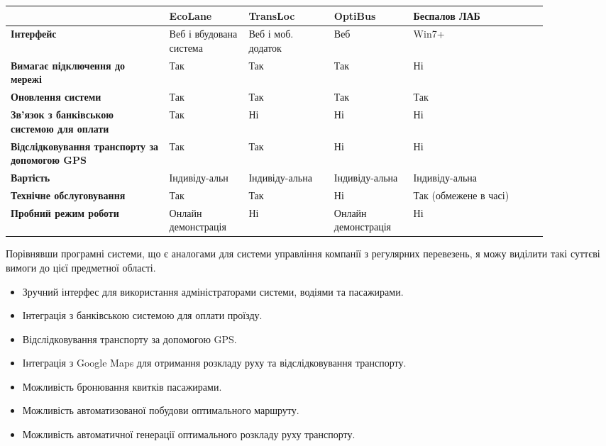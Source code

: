 \documentclass[14pt]{extreport}
\begin{document}
\begin{normalsize}
	\begin{table}[H]
		\centering
		\renewcommand*\arraystretch{1.3}
		\begin{tabular}{|p{0.26\linewidth}|p{0.13\linewidth}|p{0.14\linewidth}|p{0.13\linewidth}|p{0.22\linewidth}|}
			\hline
			 & \textbf{EcoLane} & \textbf{TransLoc} & \textbf{OptiBus} & \textbf{Беспалов ЛАБ}\\\hline
			\textbf{Інтерфейс} & Веб і вбудована система & Веб і моб. додаток & Веб & Win7+ \\\hline
			\textbf{Вимагає підключення до мережі} & Так & Так & Так & Ні\\\hline
			\textbf{Оновлення системи} & Так & Так & Так & Так\\\hline
			\textbf{Зв'язок з банківською системою для оплати} & Так & Ні & Ні & Ні\\\hline
			\textbf{Відслідковування транспорту за допомогою GPS} & Так & Так & Ні & Ні\\\hline
			\textbf{Вартість} & Індивіду-\newline альн & Індивіду-\newline альна & Індивіду-\newline альна & Індивіду-\newline альна\\\hline
			\textbf{Технічне обслуговування} & Так & Так & Ні & Так (обмежене в часі)\\\hline
			\textbf{Пробний режим роботи} & Онлайн демонстрація & Ні & Онлайн демонстрація & Ні\\\hline
		\end{tabular}
	\end{table}
	
	Порівнявши програмні системи, що є аналогами для системи управління компанії з регулярних перевезень, я можу виділити такі суттєві вимоги до цієї предметної області.
	\begin{itemize}
		\item Зручний інтерфес для використання адміністраторами системи, водіями та пасажирами.
		\item Інтеграція з банківською системою для оплати проїзду.
		\item Відслідковування транспорту за допомогою GPS.
		\item Інтеграція з Google Maps для отримання розкладу руху та відслідковування транспорту.
		\item Можливість бронювання квитків пасажирами.
		\item Можливість автоматизованої побудови оптимального маршруту.
		\item Можливість автоматичної генерації оптимального розкладу руху транспорту.
	\end{itemize}


\end{normalsize}
\end{document}
